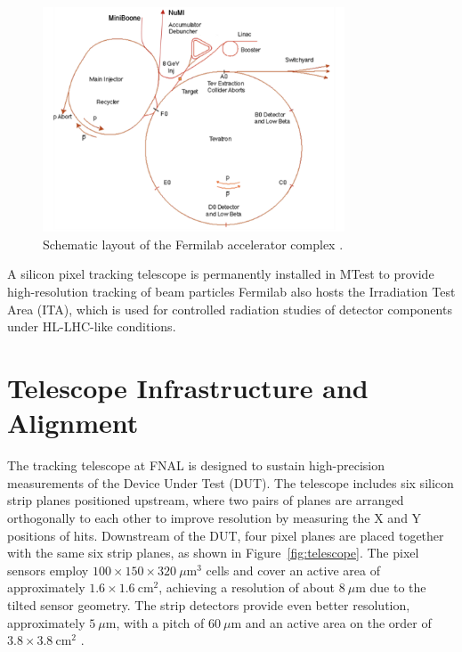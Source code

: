 \begin{figure}[H]
    \centering
    \includegraphics[width=0.8\textwidth]{images/Fermilab_accelerator.png}
    \caption{Schematic layout of the Fermilab accelerator complex \cite{Stephen_Holmes_2011}.}
    \label{fig:fermi_complex}
\end{figure}

A silicon pixel tracking telescope is permanently installed in MTest to provide high-resolution tracking of beam particles Fermilab also hosts the Irradiation Test Area (ITA), which is used for controlled radiation studies of detector components under HL-LHC-like conditions.

\section{Telescope Infrastructure and Alignment}

The tracking telescope at FNAL is designed to sustain high-precision measurements of the Device Under Test (DUT). The telescope includes six silicon strip planes positioned upstream, where two pairs of planes are arranged orthogonally to each other to improve resolution by measuring the X and Y positions of hits. Downstream of the DUT, four pixel planes are placed together with the same six strip planes, as shown in Figure~\ref{fig:telescope}. The pixel sensors employ $100 \times 150 \times 320~\mu\text{m}^3$ cells and cover an active area of approximately $1.6 \times 1.6~\text{cm}^2$, achieving a resolution of about $8~\mu\text{m}$ due to the tilted sensor geometry. The strip detectors provide even better resolution, approximately $5~\mu\text{m}$, with a pitch of $60~\mu\text{m}$ and an active area on the order of $3.8 \times 3.8~\text{cm}^2$ \cite{KWAN2016162}.

